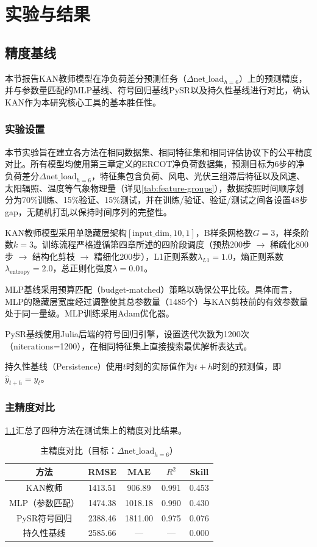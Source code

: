\chapter{实验与结果}

\section{精度基线}

本节报告KAN教师模型在净负荷差分预测任务（$\Delta\text{net\_load}_{h=6}$）上的预测精度，并与参数量匹配的MLP基线、符号回归基线PySR以及持久性基线进行对比，确认KAN作为本研究核心工具的基本胜任性。

\subsection{实验设置}

本节实验旨在建立各方法在相同数据集、相同特征集和相同评估协议下的公平精度对比。所有模型均使用第三章定义的ERCOT净负荷数据集，预测目标为6步的净负荷差分$\Delta\text{net\_load}_{h=6}$，特征集包含负荷、风电、光伏三组滞后特征以及风速、太阳辐照、温度等气象物理量（详见\cref{tab:feature-groups}），数据按照时间顺序划分为70\%训练、15\%验证、15\%测试，并在训练/验证、验证/测试之间各设置48步gap，无随机打乱以保持时间序列的完整性。

KAN教师模型采用单隐藏层架构$[\text{input\_dim}, 10, 1]$，B样条网格数$G=3$，样条阶数$k=3$。训练流程严格遵循第四章所述的四阶段调度（预热200步 $\to$ 稀疏化800步 $\to$ 结构化剪枝 $\to$ 精细化200步），L1正则系数$\lambda_{L1}=1.0$，熵正则系数$\lambda_{\text{entropy}}=2.0$，总正则化强度$\lambda=0.01$。

MLP基线采用预算匹配（budget-matched）策略以确保公平比较。具体而言，MLP的隐藏层宽度经过调整使其总参数量（1485个）与KAN剪枝前的有效参数量处于同一量级。MLP训练采用Adam优化器。

PySR基线使用Julia后端的符号回归引擎\cite{cranmer2023pysr}，设置迭代次数为1200次（niterations=1200），在相同特征集上直接搜索最优解析表达式。

持久性基线（Persistence）使用$t$时刻的实际值作为$t+h$时刻的预测值，即$\hat{y}_{t+h} = y_t$。

\subsection{主精度对比}

\cref{tab:main-accuracy}汇总了四种方法在测试集上的精度对比结果。

\begin{table}[htbp]
\centering
\caption{主精度对比（目标：$\Delta\text{net\_load}_{h=6}$）}
\label{tab:main-accuracy}
\begin{tabular}{ccccc}
\toprule
方法 & RMSE & MAE & $R^2$ & Skill \\
\midrule
KAN教师 & 1413.51 & 906.89 & 0.991 & 0.453 \\
MLP（参数匹配） & 1474.38 & 1018.18 & 0.990 & 0.430 \\
PySR符号回归 & 2388.46 & 1811.00 & 0.975 & 0.076 \\
持久性基线 & 2585.66 & — & — & 0.000 \\
\bottomrule
\end{tabular}
\end{table}

